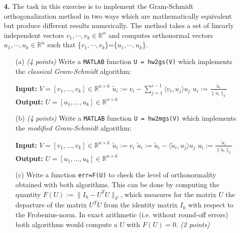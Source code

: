 \documentclass[10pt]{report}
\begin{document}
\begin{enumerate}

 \item[\textbf{4.}]
 The task in this exercise is to implement the Gram-Schmidt
  orthogonalization method in two ways which are mathematically equivalent but
  produce different results numerically. The method takes a set of linearly
  independent vectors $v_1,\cdots,v_k\in\mathbb{R}^n$ and computes
  orthonormal vectors $u_1,\cdots,u_k\in\mathbb{R}^n$ such that 
  \{$v_1,\cdots,v_k$\}=\{$u_1,\cdots,u_k$\}. 
  \begin{enumerate}

    \item[(a)]  \textit{(4 points)} Write a \verb+MATLAB+ function \verb+U = hw2gs(V)+ which
    implements the \textit{classical Gram-Schmidt} algorithm:
    \begin{algorithmic}
    \State \textbf{Input:} $V=[v_1,\ldots,v_k]\in\mathbb{R}^{n\times k}$ 
    \State $\tilde{u}_i:=v_i-\sum_{j=1}^{i-1}\langle v_i,u_j\rangle u_j$ 
    \State $u_i:=\frac{\tilde{u}_i}{\|\tilde{u}_i\|_2}$
    \EndFor
    \State \textbf{Output:} $U=[u_1,\ldots,u_k]\in\mathbb{R}^{n\times k}$ 
    \end{algorithmic}

    \item[(b)] \textit{(4 points)}  Write a \verb+MATLAB+ function \verb+U = hw2mgs(V)+ which
    implements the \textit{modified Gram-Schmidt} algorithm:
    \begin{algorithmic}
    \State \textbf{Input:} $V=[v_1,\ldots,v_k]\in\mathbb{R}^{n\times k}$ 
    \State $\tilde{u}_i:=v_i$
    \State $\tilde{u}_i:=\tilde{u}_i-\langle \tilde{u}_i,u_j\rangle u_j$ 
    \EndFor
    \State $u_i:=\frac{\tilde{u}_i}{\|\tilde{u}_i\|_2}$
    \EndFor
    \State \textbf{Output:} $U=[u_1,\ldots,u_k]\in\mathbb{R}^{n\times k}$ 
    \end{algorithmic}
          
    \item[(c)]  Write a function \verb+err=F(U)+ to check the level of orthonormality obtained with both
    algorithms. 
    This can be done by computing the quantity $F(U):=\|I_k-U^TU\|_{F}$, which
    measures for the matrix $U$ the departure of the matrix $U^TU$ from the
    identity matrix $I_k$ with respect to the Frobenius-norm. In exact
    arithmetic (i.e. without round-off errors) both algorithms would compute
    a $U$ with $F(U)=0$. \textit{(2 points)}


\end{enumerate}
\end{enumerate}
\end{document}
